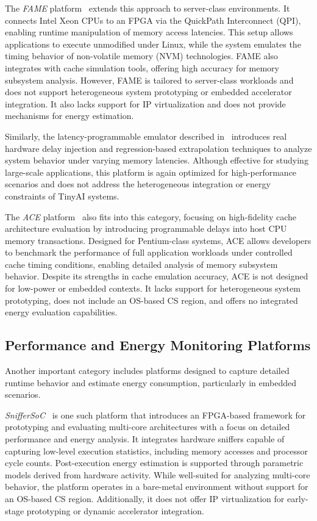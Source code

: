             The \emph{FAME} platform~\cite{fame} extends this approach to server-class environments. It connects Intel Xeon CPUs to an FPGA via the QuickPath Interconnect (QPI), enabling runtime manipulation of memory access latencies. This setup allows applications to execute unmodified under Linux, while the system emulates the timing behavior of non-volatile memory (NVM) technologies. FAME also integrates with cache simulation tools, offering high accuracy for memory subsystem analysis. However, FAME is tailored to server-class workloads and does not support heterogeneous system prototyping or embedded accelerator integration. It also lacks support for IP virtualization and does not provide mechanisms for energy estimation.
            
            Similarly, the latency-programmable emulator described in~\cite{extrapolator} introduces real hardware delay injection and regression-based extrapolation techniques to analyze system behavior under varying memory latencies. Although effective for studying large-scale applications, this platform is again optimized for high-performance scenarios and does not address the heterogeneous integration or energy constraints of TinyAI systems.

            The \emph{ACE} platform~\cite{ace} also fits into this category, focusing on high-fidelity cache architecture evaluation by introducing programmable delays into host CPU memory transactions. Designed for Pentium-class systems, ACE allows developers to benchmark the performance of full application workloads under controlled cache timing conditions, enabling detailed analysis of memory subsystem behavior. Despite its strengths in cache emulation accuracy, ACE is not designed for low-power or embedded contexts. It lacks support for heterogeneous system prototyping, does not include an OS-based CS region, and offers no integrated energy evaluation capabilities.
        
        \subsection{Performance and Energy Monitoring Platforms}
        
            Another important category includes platforms designed to capture detailed runtime behavior and estimate energy consumption, particularly in embedded scenarios.
            
            \emph{SnifferSoC}~\cite{sniffersoc} is one such platform that introduces an FPGA-based framework for prototyping and evaluating multi-core architectures with a focus on detailed performance and energy analysis. It integrates hardware sniffers capable of capturing low-level execution statistics, including memory accesses and processor cycle counts. Post-execution energy estimation is supported through parametric models derived from hardware activity. While well-suited for analyzing multi-core behavior, the platform operates in a bare-metal environment without support for an OS-based CS region. Additionally, it does not offer IP virtualization for early-stage prototyping or dynamic accelerator integration.
            
